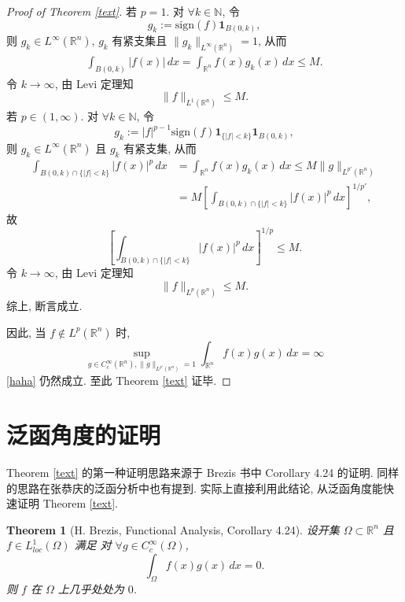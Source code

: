 \documentclass[a4paper,11pt]{article}
\newtheorem{theorem}{Theorem}[section]
\theoremstyle{definition}
\begin{document}
\begin{CJK*}{UTF8}{gbsn}
\begin{proof}[Proof of Theorem \ref{text}]
    若 $ p = 1 $. 对 $ \forall k \in \mathbb{N} $, 令
    $$
        g_k := \mathrm{sign} (f) \mathbf{1}_{B(0, k)},
    $$
    则 $ g_k \in L^\infty(\mathbb{R}^n) $, $ g_k $ 有紧支集且 $ \|g_k\|_{L^\infty(\mathbb{R}^n)} = 1 $, 从而
    \begin{align*}
        \int_{B(0, k)} |f(x)| \, dx
            = \int_{\mathbb{R}^n} f(x) g_k(x) \, dx
            \leq M.
    \end{align*}
    令 $ k \to \infty $, 由 Levi 定理知
    $$
        \| f \|_{L^1(\mathbb{R}^n)} \leq M.
    $$
    若 $ p \in (1, \infty) $. 对 $ \forall k \in \mathbb{N} $, 令
    $$
        g_k := |f|^{p-1} \mathrm{sign}(f) \mathbf{1}_{\{|f| < k\}} \mathbf{1}_{B(0, k)},
    $$
    则 $ g_k \in L^\infty(\mathbb{R}^n) $ 且 $ g_k $ 有紧支集, 从而
    \begin{align*}
        \int_{B(0, k) \cap \{|f| < k\}} |f(x)|^p \, dx
            &= \int_{\mathbb{R}^n} f(x) g_k(x) \, dx
            \leq M \| g \|_{L^{p'}(\mathbb{R}^n)} \\
            &= M \left[ \int_{B(0, k) \cap \{|f| < k\}} |f(x)|^p \, dx \right]^{1/p'},
    \end{align*}
    故
    $$
        \left[ \int_{B(0, k) \cap \{|f| < k\}} |f(x)|^p \, dx \right]^{1/p} \leq M.
    $$
    令 $ k \to \infty $, 由 Levi 定理知
    $$
        \| f \|_{L^p(\mathbb{R}^n)} \leq M.
    $$
    综上, 断言成立.
    
    因此, 当 $ f \notin L^p(\mathbb{R}^n) $ 时,
    $$
        \sup_{g \in C_c^\infty(\mathbb{R}^n), \| g \|_{L^{p'}(\mathbb{R}^n)} = 1} 
            \int_{\mathbb{R}^n} f(x) g(x) \, dx = \infty
    $$
    \eqref{haha} 仍然成立. 至此 Theorem \ref{text} 证毕.
\end{proof}

\section{泛函角度的证明}

Theorem \ref{text} 的第一种证明思路来源于 Brezis 书中 Corollary 4.24 的证明. 同样的思路在张恭庆的泛函分析中也有提到.
实际上直接利用此结论, 从泛函角度能快速证明 Theorem \ref{text}.

\begin{theorem}[H. Brezis, Functional Analysis, Corollary 4.24] \label{h}
    设开集 $ \Omega \subset \mathbb{R}^n $ 且 $ f \in L^1_{loc}(\Omega) $ 满足
    对 $ \forall g \in C_c^\infty(\Omega) $,
    $$
        \int_\Omega f(x) g(x) \, dx = 0.
    $$
    则 $ f $ 在 $ \Omega $ 上几乎处处为 $ 0 $.
\end{theorem}


\end{CJK*}
\end{document}
